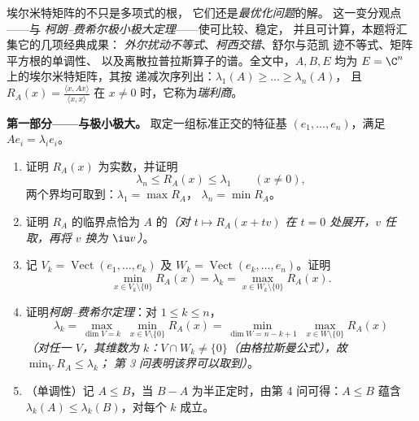 \begin{problem}\label{pb:b2:hermitian:1}
埃尔米特矩阵的不只是多项式的根，
它们还是\emph{最优化问题}的解。
这一变分观点——与
\emph{柯朗–费希尔极小极大定理}——使可比较、稳定，
并且可计算，本题将汇集它的几项经典成果：
\emph{外尔扰动不等式}、\emph{柯西交错}、舒尔与范凯
迹不等式、矩阵平方根的单调性、
以及离散拉普拉斯算子的谱。全文中，$A, B,
E$ 均为 $E = \C^n$ 上的埃尔米特矩阵，其按
递减次序列出：$\lambda_1(A) \geq \dots \geq \lambda_n(A)$，
且 $R_A(x) = \frac{\langle x, Ax\rangle}{\langle x, x\rangle}$
在 $x \neq 0$ 时，它称为\emph{瑞利商}。

\medskip
\noindent\textbf{第一部分——与极小极大。}
取定一组标准正交的特征基 $(e_1, \dots, e_n)$，满足 $Ae_i =
\lambda_ie_i$。
\begin{enumerate}
  \item 证明 $R_A(x)$ 为实数，并证明
        \[
        \lambda_n \leq R_A(x) \leq \lambda_1
        \qquad (x \neq 0),
        \]
        两个界均可取到：$\lambda_1 = \max R_A$，
        $\lambda_n = \min R_A$。
  \item 证明 $R_A$ 的临界点恰为
        $A$ 的\emph{（对 $t \mapsto R_A(x +
        tv)$ 在 $t = 0$ 处展开，$v$ 任取，再将 $v$ 换为
        $\iu v$）}。
  \item 记 $V_k = \operatorname{Vect}(e_1, \dots, e_k)$ 及
        $W_k = \operatorname{Vect}(e_k, \dots, e_n)$。证明
        \[
        \min_{x \in V_k\setminus\{0\}} R_A(x) = \lambda_k
        = \max_{x \in W_k\setminus\{0\}} R_A(x) .
        \]
  \item 证明\emph{柯朗–费希尔定理}：对 $1 \leq
        k \leq n$，
        \[
        \lambda_k = \max_{\dim V = k}\;\min_{x \in
        V\setminus\{0\}} R_A(x)
        = \min_{\dim W = n-k+1}\;\max_{x \in
        W\setminus\{0\}} R_A(x)
        \]
        \emph{（对任一 $V$，其维数为 $k$：$V \cap W_k \neq
        \{0\}$（由格拉斯曼公式），故 $\min_V R_A \leq \lambda_k$；
        第 3 问表明该界可以取到）}。
  \item （单调性）记 $A \leq B$，当 $B - A$
        为半正定时，由第 4 问可得：$A \leq
        B$ 蕴含 $\lambda_k(A) \leq \lambda_k(B)$，对每个
        $k$ 成立。
\end{enumerate}


\end{problem}
